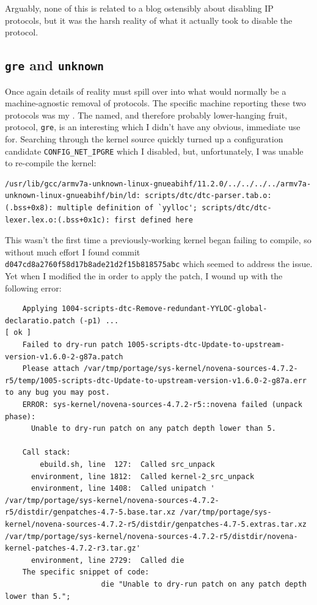 \documentclass{article}
\begin{document}
Arguably, none of this is related to a blog ostensibly about disabling IP protocols, but it was the harsh reality of what it actually took to disable the protocol.

\subsection{\texttt{gre} and \texttt{unknown}}
Once again details of reality must spill over into what would normally be a machine-agnostic removal of protocols.  The specific machine reporting these two protocols was my .  The named, and therefore probably lower-hanging fruit, protocol, \texttt{gre}, is an interesting  which I didn't have any obvious, immediate use for.  Searching through the kernel source quickly turned up a configuration candidate \texttt{CONFIG_NET_IPGRE} which I disabled, but, unfortunately, I was unable to re-compile the kernel:

\begin{verbatim}
/usr/lib/gcc/armv7a-unknown-linux-gnueabihf/11.2.0/../../../../armv7a-unknown-linux-gnueabihf/bin/ld: scripts/dtc/dtc-parser.tab.o:(.bss+0x8): multiple definition of `yylloc'; scripts/dtc/dtc-lexer.lex.o:(.bss+0x1c): first defined here
\end{verbatim}

This wasn't the first time a previously-working kernel began failing to compile\label{2019-05-07-novena-kernel-woes}, so without much effort I found commit \texttt{d047cd8a2760f58d17b8ade21d2f15b818575abc} which seemed to address the issue.  Yet when I modified the  in order to apply the patch, I wound up with the following error:

\begin{verbatim}
	Applying 1004-scripts-dtc-Remove-redundant-YYLOC-global-declaratio.patch (-p1) ...                                                                  [ ok ]
	Failed to dry-run patch 1005-scripts-dtc-Update-to-upstream-version-v1.6.0-2-g87a.patch
	Please attach /var/tmp/portage/sys-kernel/novena-sources-4.7.2-r5/temp/1005-scripts-dtc-Update-to-upstream-version-v1.6.0-2-g87a.err to any bug you may post.
	ERROR: sys-kernel/novena-sources-4.7.2-r5::novena failed (unpack phase):
	  Unable to dry-run patch on any patch depth lower than 5.

	Call stack:
	    ebuild.sh, line  127:  Called src_unpack
	  environment, line 1812:  Called kernel-2_src_unpack
	  environment, line 1408:  Called unipatch '  /var/tmp/portage/sys-kernel/novena-sources-4.7.2-r5/distdir/genpatches-4.7-5.base.tar.xz /var/tmp/portage/sys-kernel/novena-sources-4.7.2-r5/distdir/genpatches-4.7-5.extras.tar.xz /var/tmp/portage/sys-kernel/novena-sources-4.7.2-r5/distdir/novena-kernel-patches-4.7.2-r3.tar.gz'
	  environment, line 2729:  Called die
	The specific snippet of code:
	                  die "Unable to dry-run patch on any patch depth lower than 5.";
\end{verbatim}
\end{document}
